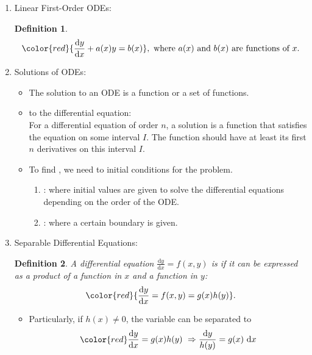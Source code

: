 \documentclass[12pt, a4paper]{article}
\newtheorem{definition}{Definition}[subsection]
\def\d{{\mathrm{d}}}
\begin{document}
\begin{enumerate}
    \item Linear First-Order ODEs: 
    \begin{definition}
        $${\color{red}{\frac{\d y}{\d x}+a(x)y=b(x)}},\text{ where }a(x)\text{ and }b(x)\text{ are functions of }x.$$
    \end{definition}
    \item Solutions of ODEs: 
    \begin{itemize}
        \item The solution to an ODE is a function or a set of functions.
        \item {\color{red}{General solution}} to the differential equation: \\
        For a differential equation of order $n$, a solution is a function that satisfies the equation on some interval $I$. The function should have at least its first $n$ derivatives on this interval $I$. 
        \item To find {\color{red}{particular solutions}}, we need to initial conditions for the problem. 
        \begin{enumerate}
            \item {\color{red}{Initial Value Problem (IVP)}}: where initial values are given to solve the differential equations depending on the order of the ODE. \\
            {\color{green}{E.g. $y(0),\ t(0),\ (0,y)$.}}
            \item {\color{red}{Boundary Value Problem}}: where a certain boundary is given. \\
            {\color{green}{E.g. $(x,y)$.}}
        \end{enumerate}
    \end{itemize}
    \item Separable Differential Equations: 
    \begin{definition}
        A differential equation $\frac{\d y}{\d x}=f(x,y)$ is \textbf{\color{red}{separable}} if it can be expressed as a product of a function in $x$ and a function in $y$: 
        $${\color{red}{\frac{\d y}{\d x}=f(x,y)=g(x)h(y)}}.$$
    \end{definition}
    \begin{itemize}
        \item Particularly, if $h(x)\neq 0$, the variable can be separated to 
        $$\color{red}\begin{aligned}
            {\frac{\d y}{\d x}=g(x)h(y)}\ \Rightarrow \frac{\d y}{h(y)}&=g(x)\ \d x\\

\end{aligned}$$
\end{itemize}
\end{enumerate}
\end{document}
